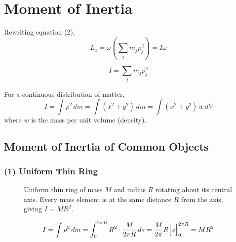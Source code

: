 \section{Moment of Inertia}

Rewriting equation (2),
\[
    L_z = \omega\!\left(\sum_j m_j \rho_j^2\right) = I\omega
\]

\begin{definition}
\[
    \boxed{I = \sum_j m_j \rho_j^2}
\]
\end{definition}

For a continuous distribution of matter,
\[
    I = \int \rho^2\,dm = \int(x^2+y^2)\,dm = \int(x^2+y^2)\,w\,dV
\]
where $w$ is the mass per unit volume (density).

\subsection{Moment of Inertia of Common Objects}

\subsubsection{(1) Uniform Thin Ring}

\begin{figure}[H]
\begin{center}
\end{center}
\caption{Uniform thin ring of mass $M$ and radius $R$ rotating about its central axis. Every mass element is at the same distance $R$ from the axis, giving $I = MR^2$.}
\label{fig:moi_ring}
\end{figure}

\[
    I = \int \rho^2\,dm = \int_0^{2\pi R} R^2 \cdot \frac{M}{2\pi R}\,ds
    = \frac{M}{2\pi} R \Bigl[s\Bigr]_0^{2\pi R} = MR^2
\]

